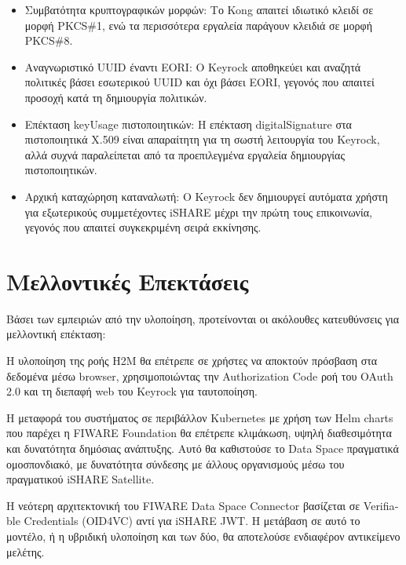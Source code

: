 \begin{itemize}
    \item Συμβατότητα κρυπτογραφικών μορφών: Το \textlatin{Kong}
    απαιτεί ιδιωτικό κλειδί σε μορφή \textlatin{PKCS\#1}, ενώ τα
    περισσότερα εργαλεία παράγουν κλειδιά σε μορφή \textlatin{PKCS\#8}.
    \item Αναγνωριστικό \textlatin{UUID} έναντι \textlatin{EORI}:
    Ο \textlatin{Keyrock} αποθηκεύει και αναζητά πολιτικές βάσει εσωτερικού
    \textlatin{UUID} και όχι βάσει \textlatin{EORI}, γεγονός που απαιτεί
    προσοχή κατά τη δημιουργία πολιτικών.
    \item Επέκταση \textlatin{keyUsage} πιστοποιητικών: Η επέκταση
    \textlatin{digitalSignature} στα πιστοποιητικά \textlatin{X.509} είναι
    απαραίτητη για τη σωστή λειτουργία του \textlatin{Keyrock}, αλλά
    συχνά παραλείπεται από τα προεπιλεγμένα εργαλεία δημιουργίας
    πιστοποιητικών.
    \item Αρχική καταχώρηση καταναλωτή: Ο \textlatin{Keyrock} δεν
    δημιουργεί αυτόματα χρήστη για εξωτερικούς συμμετέχοντες
    \textlatin{iSHARE} μέχρι την πρώτη τους επικοινωνία, γεγονός που
    απαιτεί συγκεκριμένη σειρά εκκίνησης.
\end{itemize}

\section{Μελλοντικές Επεκτάσεις}
\label{sec:future-work}

Βάσει των εμπειριών από την υλοποίηση, προτείνονται οι ακόλουθες
κατευθύνσεις για μελλοντική επέκταση:

Η υλοποίηση της ροής \textlatin{H2M} θα επέτρεπε σε χρήστες να αποκτούν
πρόσβαση στα δεδομένα μέσω \textlatin{browser}, χρησιμοποιώντας την
\textlatin{Authorization Code} ροή του \textlatin{OAuth 2.0} και τη διεπαφή
\textlatin{web} του \textlatin{Keyrock} για ταυτοποίηση.

Η μεταφορά του συστήματος σε περιβάλλον \textlatin{Kubernetes} με χρήση των
\textlatin{Helm charts} που παρέχει η \textlatin{FIWARE Foundation} θα
επέτρεπε κλιμάκωση, υψηλή διαθεσιμότητα και δυνατότητα δημόσιας ανάπτυξης.
Αυτό θα καθιστούσε το \textlatin{Data Space} πραγματικά ομοσπονδιακό, με
δυνατότητα σύνδεσης με άλλους οργανισμούς μέσω του πραγματικού
\textlatin{iSHARE Satellite}.

Η νεότερη αρχιτεκτονική του \textlatin{FIWARE Data Space Connector}
βασίζεται σε \textlatin{Verifiable Credentials} (\textlatin{OID4VC}) αντί
για \textlatin{iSHARE JWT}. Η μετάβαση σε αυτό το μοντέλο, ή η υβριδική
υλοποίηση και των δύο, θα αποτελούσε ενδιαφέρον αντικείμενο μελέτης.

